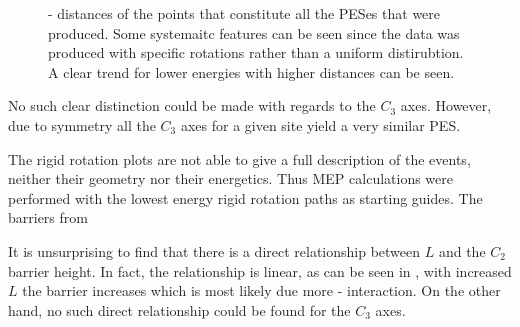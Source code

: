 \begin{figure}[h]
\begin{center}
    \parbox{0.85\linewidth}{
      \caption{- distances of the points that constitute all the PESes that were produced.
Some systemaitc features can be seen since the data was produced with specific rotations rather than a uniform distirubtion.
A clear trend for lower energies with higher distances can be seen.
      }
      \label{fig:h-mg-distances}
    }
\end{center}
\end{figure}


No such clear distinction could be made with regards to the $C_3$ axes.
However, due to symmetry all the $C_3$ axes for a given site yield a very similar PES. 

The rigid rotation plots are not able to give a full description of the events, neither their geometry nor their energetics.
Thus MEP calculations were performed with the lowest energy rigid rotation paths as starting guides.
The barriers from 


It is unsurprising to find that there is a direct relationship between $L$ and the $C_2$ barrier height.
In fact, the relationship is linear, as can be seen in , with increased $L$ the barrier increases which is most likely due more - interaction.
On the other hand, no such direct relationship could be found for the $C_3$ axes.

\incomplete
